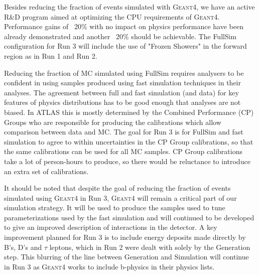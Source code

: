 Besides reducing the fraction of events simulated with G\textsc{eant}4, we have an active R\&D program aimed at optimizing the CPU requirements of G\textsc{eant}4. Performance gains of ~20\% with no impact on physics performance have been already demonstrated and another ~20\% should be achievable.  The FullSim configuration for Run 3 will include the use of "Frozen Showers" in the forward region as in Run 1 and Run 2.

Reducing the fraction of MC simulated using FullSim requires analysers to be confident in using samples produced using fast simulation techniques in their analyses.  The agreement between full and fast simulation (and data) for key features of physics distributions has to be good enough that analyses are not biased.  In ATLAS this is mostly determined by the Combined Performance (CP) Groups who are responsible for producing the calibrations which allow comparison between data and MC.  The goal for Run 3 is for FullSim and fast simulation to agree to within uncertainties in the CP Group calibrations, so that the same calibrations can be used for all MC samples.  CP Group calibrations take a lot of person-hours to produce, so there would be reluctance to introduce an extra set of calibrations.

It should be noted that despite the goal of reducing the fraction of events simulated using G\textsc{eant}4 in Run 3, G\textsc{eant}4 will remain a critical part of our simulation strategy. It will be used to produce the samples used to tune parameterizations used by the fast simulation and will continued to be developed to give an improved description of interactions in the detector. A key improvement planned for Run 3 is to include energy deposits made directly by B's, D's and $\tau$ leptons, which in Run 2 were dealt with solely by the Generation step. This blurring of the line between Generation and Simulation will continue in Run 3 as G\textsc{eant}4 works to include b-physics in their physics lists.

